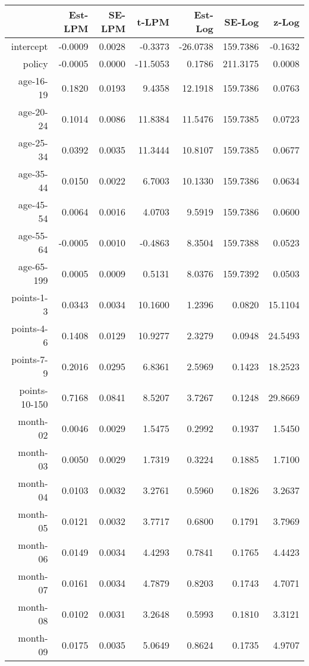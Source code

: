 \documentclass[10pt]{article}
\begin{document}
\begin{table}[ht]
\centering
\begin{tabular}{rrrrrrr}
  \hline
 & Est-LPM & SE-LPM & t-LPM & Est-Log & SE-Log & z-Log \\ 
  \hline
intercept & -0.0009 & 0.0028 & -0.3373 & -26.0738 & 159.7386 & -0.1632 \\ 
  policy & -0.0005 & 0.0000 & -11.5053 & 0.1786 & 211.3175 & 0.0008 \\ 
  age-16-19 & 0.1820 & 0.0193 & 9.4358 & 12.1918 & 159.7386 & 0.0763 \\ 
  age-20-24 & 0.1014 & 0.0086 & 11.8384 & 11.5476 & 159.7385 & 0.0723 \\ 
  age-25-34 & 0.0392 & 0.0035 & 11.3444 & 10.8107 & 159.7385 & 0.0677 \\ 
  age-35-44 & 0.0150 & 0.0022 & 6.7003 & 10.1330 & 159.7386 & 0.0634 \\ 
  age-45-54 & 0.0064 & 0.0016 & 4.0703 & 9.5919 & 159.7386 & 0.0600 \\ 
  age-55-64 & -0.0005 & 0.0010 & -0.4863 & 8.3504 & 159.7388 & 0.0523 \\ 
  age-65-199 & 0.0005 & 0.0009 & 0.5131 & 8.0376 & 159.7392 & 0.0503 \\ 
  points-1-3 & 0.0343 & 0.0034 & 10.1600 & 1.2396 & 0.0820 & 15.1104 \\ 
  points-4-6 & 0.1408 & 0.0129 & 10.9277 & 2.3279 & 0.0948 & 24.5493 \\ 
  points-7-9 & 0.2016 & 0.0295 & 6.8361 & 2.5969 & 0.1423 & 18.2523 \\ 
  points-10-150 & 0.7168 & 0.0841 & 8.5207 & 3.7267 & 0.1248 & 29.8669 \\ 
  month-02 & 0.0046 & 0.0029 & 1.5475 & 0.2992 & 0.1937 & 1.5450 \\ 
  month-03 & 0.0050 & 0.0029 & 1.7319 & 0.3224 & 0.1885 & 1.7100 \\ 
  month-04 & 0.0103 & 0.0032 & 3.2761 & 0.5960 & 0.1826 & 3.2637 \\ 
  month-05 & 0.0121 & 0.0032 & 3.7717 & 0.6800 & 0.1791 & 3.7969 \\ 
  month-06 & 0.0149 & 0.0034 & 4.4293 & 0.7841 & 0.1765 & 4.4423 \\ 
  month-07 & 0.0161 & 0.0034 & 4.7879 & 0.8203 & 0.1743 & 4.7071 \\ 
  month-08 & 0.0102 & 0.0031 & 3.2648 & 0.5993 & 0.1810 & 3.3121 \\ 
  month-09 & 0.0175 & 0.0035 & 5.0649 & 0.8624 & 0.1735 & 4.9707 \\ 

\end{tabular}
\end{table}
\end{document}
